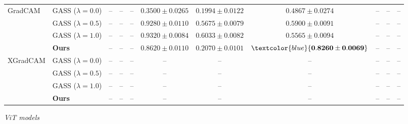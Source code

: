 \begin{table}[t]
{\begin{tabular}{ll|ccc|ccc|ccc}
\multirow{4}{*}{GradCAM}
& GASS ($\lambda=0.0$) & -- & -- & -- & $0.3500 \pm 0.0265$ & $\mathbf{0.1994 \pm 0.0122}$ & $0.4867 \pm 0.0274$ & -- & -- & -- \\
& GASS ($\lambda=0.5$) & -- & -- & -- & $0.9280 \pm 0.0110$ & $0.5675 \pm 0.0079$ & $0.5900 \pm 0.0091$ & -- & -- & -- \\
& GASS ($\lambda=1.0$) & -- & -- & -- & $\mathbf{0.9320 \pm 0.0084}$ & $0.6033 \pm 0.0082$ & $0.5565 \pm 0.0094$ & -- & -- & -- \\
& \textbf{Ours} & -- & -- & -- & $0.8620 \pm 0.0110$ & $0.2070 \pm 0.0101$ & $\textcolor{blue}{\mathbf{0.8260 \pm 0.0069}}$ & -- & -- & -- \\

\midrule
\multirow{4}{*}{XGradCAM}
& GASS ($\lambda=0.0$) & -- & -- & -- & -- & -- & -- & -- & -- & -- \\
& GASS ($\lambda=0.5$) & -- & -- & -- & -- & -- & -- & -- & -- & -- \\
& GASS ($\lambda=1.0$) & -- & -- & -- & -- & -- & -- & -- & -- & -- \\
& \textbf{Ours} & -- & -- & -- & -- & -- & -- & -- & -- & -- \\

\bottomrule
\end{tabular}
}

\vspace{0.5cm}
\textit{ViT models}\\[0.1cm]
\end{table}

